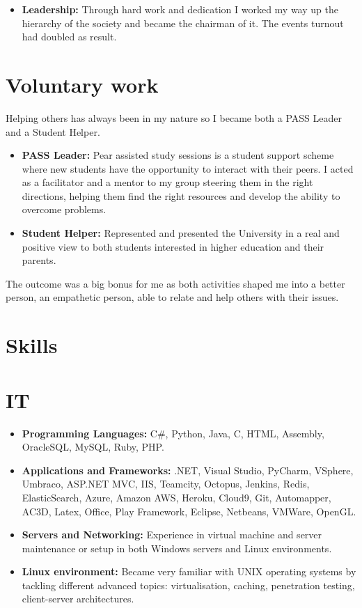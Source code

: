 \documentclass[12pt,a4paper]{res}
\begin{document}
\begin{resume}
\begin{itemize}
      \item {\bf Leadership:} Through hard work and dedication I worked my way up the hierarchy of the society and became the chairman of it. The events turnout had doubled as result.
     \end{itemize}

\section{\large\bf Voluntary work}
\vspace{2mm}
Helping others has always been in my nature so I became both a PASS Leader and a Student Helper.
      \begin{itemize}
      \item {\bf PASS Leader:} Pear assisted study sessions is a student support scheme where new students have the opportunity to interact with their peers. I acted as a facilitator and a mentor to my group steering them in the right directions, helping them find the right resources and develop the ability to overcome problems.
      \item {\bf Student Helper:} Represented and presented the University in a real
    and positive view to both students interested in higher education and their parents. 
      \end{itemize}
\vspace{-3mm}
    The outcome was a big bonus for me as both activities shaped me into a better person, an empathetic person, able to relate and
    help others with their issues.
    \vspace{-3mm}

\section{\large\bf Skills}
\vspace{2mm}
\section{IT}
\vspace{-1mm}
  \begin{itemize}

  \item[] {\bf Programming Languages:} C\#, Python, Java, C, HTML, Assembly, OracleSQL, MySQL, Ruby, PHP.
  \item[] {\bf Applications and Frameworks:} .NET, Visual Studio, PyCharm, VSphere, Umbraco, ASP.NET MVC, IIS, Teamcity, Octopus, Jenkins, Redis, ElasticSearch, Azure, Amazon AWS, Heroku, Cloud9, Git, Automapper, AC3D, Latex, Office, Play Framework, Eclipse, Netbeans, VMWare, OpenGL.
  \item[] {\bf Servers and Networking:} Experience in virtual machine and server maintenance or setup in both Windows servers and Linux environments.
  \item[] {\bf Linux environment:} Became very familiar with UNIX operating systems by tackling different advanced topics: virtualisation, caching, penetration testing, client-server architectures.


\end{itemize}
\end{resume}
\end{document}
